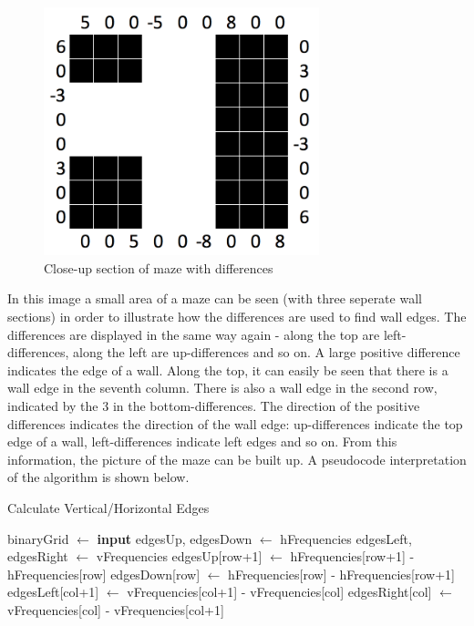 \documentclass[titlepage]{article}
\begin{document}
\begin{figure}[H]
  \centering
  \includegraphics[width=8cm]{Zoom_differences.png}
  \caption{Close-up section of maze with differences}
  \label{fig:dijk}
\end{figure}

In this image a small area of a maze can be seen (with three seperate wall sections) in order to illustrate how the differences are used to find wall edges. The differences are displayed in the same way again - along the top are left-differences, along the left are up-differences and so on. A large positive difference indicates the edge of a wall. Along the top, it can easily be seen that there is a wall edge in the seventh column. There is also a wall edge in the second row, indicated by the 3 in the bottom-differences. The direction of the positive differences indicates the direction of the wall edge: up-differences indicate the top edge of a wall, left-differences indicate left edges and so on. From this information, the picture of the maze can be built up. A pseudocode interpretation of the algorithm is shown below.

\begin{algorithm}[H]
\caption{Calculate Vertical/Horizontal Edges}
\begin{algorithmic}[1]
	\State binaryGrid $\gets$ \textbf{input}
    	\State edgesUp, edgesDown $\gets$ hFrequencies
    	\State edgesLeft, edgesRight $\gets$ vFrequencies
		\State edgesUp[row+1]  $\gets$ hFrequencies[row+1] - hFrequencies[row]
		\State edgesDown[row]  $\gets$ hFrequencies[row] - hFrequencies[row+1]
        \EndFor
		\State edgesLeft[col+1]  $\gets$ vFrequencies[col+1] - vFrequencies[col]
		\State edgesRight[col]  $\gets$ vFrequencies[col] - vFrequencies[col+1]
        \EndFor
\end{algorithmic}
\end{algorithm}
\end{document}
